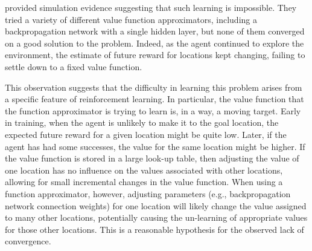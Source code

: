 \documentclass[preprint,12pt,authoryear]{elsarticle}
\begin{document}

\cite{Boyan:1995:Approximating} provided simulation evidence
suggesting that such learning is impossible. They tried a variety of
different value function approximators, including a backpropagation
network with a single hidden layer, but none of them converged on a
good solution to the problem. Indeed, as the agent continued to
explore the environment, the estimate of future reward for locations
kept changing, failing to settle down to a fixed value function.

This observation suggests that the difficulty in learning this problem
arises from a specific feature of reinforcement learning. In
particular, the value function that the function approximator is
trying to learn is, in a way, a moving target. Early in training, when
the agent is unlikely to make it to the goal location, the expected
future reward for a given location might be quite low. Later, if the
agent has had some successes, the value for the same location might be
higher. If the value function is stored in a large look-up table, then
adjusting the value of one location has no influence on the values
associated with other locations, allowing for small incremental
changes in the value function. When using a function approximator,
however, adjusting parameters (e.g., backpropagation network
connection weights) for one location will likely change the value
assigned to many other locations, potentially causing the un-learning
of appropriate values for those other locations. This is a reasonable
hypothesis for the observed lack of convergence.
\end{document}
